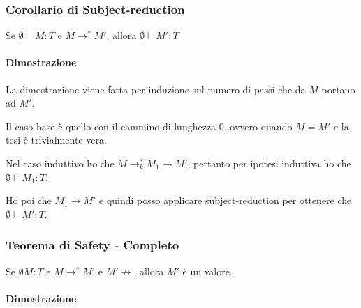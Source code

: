 


\subsubsection{Corollario di Subject-reduction}

\begin{center}
	Se $\emptyset \vdash M : T$ e $M \rightarrow^* M'$, allora $\emptyset \vdash M' : T$
\end{center}

\paragraph{Dimostrazione}

La dimostrazione viene fatta per induzione sul numero di passi che da $M$ portano ad $M'$.

Il caso base è quello con il cammino di lunghezza 0, ovvero quando $M = M'$ e la tesi è trivialmente vera.

Nel caso induttivo ho che $M \rightarrow^{*}_k M_1 \rightarrow M'$, pertanto per ipotesi induttiva ho che $\emptyset \vdash M_1 : T$. 

Ho poi che $M_1 \rightarrow M'$ e quindi posso applicare subject-reduction per ottenere che $\emptyset \vdash M' : T$.

\subsubsection{Teorema di Safety - Completo}

\begin{center}
	Se $\emptyset M : T $ e $M \rightarrow^* M'$ e $M' \not\rightarrow$, allora $M'$ è un valore.
\end{center}

\paragraph{Dimostrazione}

